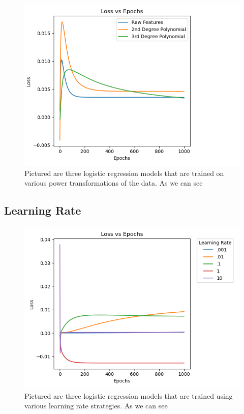 \documentclass{article}
\begin{document}
\begin{figure}[h]{
    \centering
    \includegraphics[width=.8\textwidth]{loss_poly.png}
    \caption{Pictured are three logistic regression models that are trained on various power transformations of the data. As we can see}
    \label{fig:my_label}
    }
\end{figure}

\subsection{Learning Rate}

\begin{figure}[h]{
    \centering
    \includegraphics[width=.8\textwidth]{learning_rate.png}
    \caption{Pictured are three logistic regression models that are trained using various learning rate strategies. As we can see}
    \label{fig:my_label}
    }
\end{figure}
\end{document}
